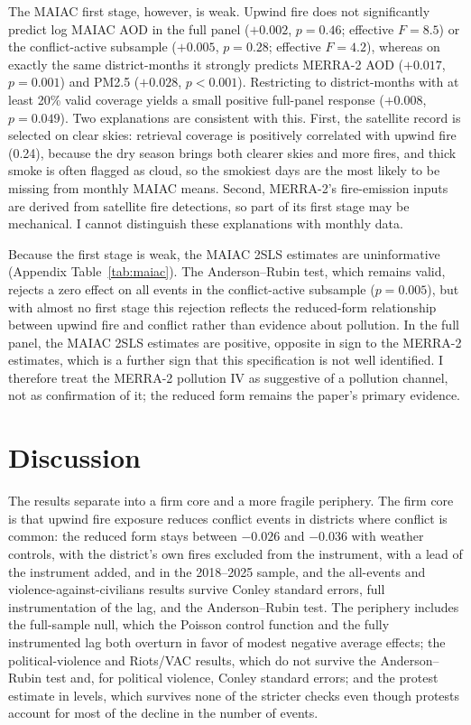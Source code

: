 \documentclass[12pt]{article}
\begin{document}
The MAIAC first stage, however, is weak. Upwind fire does not significantly predict log MAIAC AOD in the full panel ($+0.002$, $p=0.46$; effective $F = 8.5$) or the conflict-active subsample ($+0.005$, $p=0.28$; effective $F = 4.2$), whereas on exactly the same district-months it strongly predicts MERRA-2 AOD ($+0.017$, $p=0.001$) and PM2.5 ($+0.028$, $p<0.001$). Restricting to district-months with at least 20\% valid coverage yields a small positive full-panel response ($+0.008$, $p=0.049$). Two explanations are consistent with this. First, the satellite record is selected on clear skies: retrieval coverage is positively correlated with upwind fire (0.24), because the dry season brings both clearer skies and more fires, and thick smoke is often flagged as cloud, so the smokiest days are the most likely to be missing from monthly MAIAC means. Second, MERRA-2's fire-emission inputs are derived from satellite fire detections, so part of its first stage may be mechanical. I cannot distinguish these explanations with monthly data.

Because the first stage is weak, the MAIAC 2SLS estimates are uninformative (Appendix Table~\ref{tab:maiac}). The Anderson--Rubin test, which remains valid, rejects a zero effect on all events in the conflict-active subsample ($p=0.005$), but with almost no first stage this rejection reflects the reduced-form relationship between upwind fire and conflict rather than evidence about pollution. In the full panel, the MAIAC 2SLS estimates are positive, opposite in sign to the MERRA-2 estimates, which is a further sign that this specification is not well identified. I therefore treat the MERRA-2 pollution IV as suggestive of a pollution channel, not as confirmation of it; the reduced form remains the paper's primary evidence.

\section{Discussion}
\label{sec:discussion}

The results separate into a firm core and a more fragile periphery. The firm core is that upwind fire exposure reduces conflict events in districts where conflict is common: the reduced form stays between $-0.026$ and $-0.036$ with weather controls, with the district's own fires excluded from the instrument, with a lead of the instrument added, and in the 2018--2025 sample, and the all-events and violence-against-civilians results survive Conley standard errors, full instrumentation of the lag, and the Anderson--Rubin test. The periphery includes the full-sample null, which the Poisson control function and the fully instrumented lag both overturn in favor of modest negative average effects; the political-violence and Riots/VAC results, which do not survive the Anderson--Rubin test and, for political violence, Conley standard errors; and the protest estimate in levels, which survives none of the stricter checks even though protests account for most of the decline in the number of events.
\end{document}
